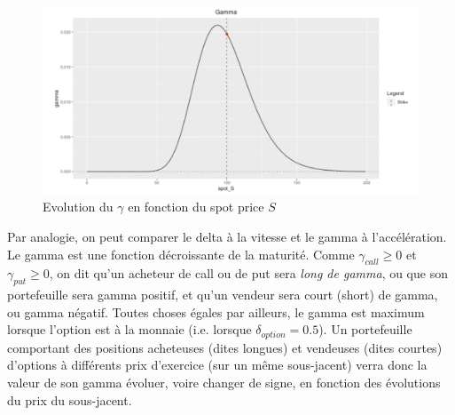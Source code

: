 \documentclass[a4paper]{article}
\begin{document}
\begin{figure}[H]
    \centering
    \includegraphics[scale=0.6]{figures/gamma.png}
    \caption{Evolution du $\gamma$ en fonction du spot price $S$}
    \label{fig:enter-label}
\end{figure}

Par analogie, on peut comparer le delta à la vitesse et le gamma à l'accélération. Le gamma est une fonction décroissante de la maturité. 
Comme $\gamma_{call} \geq 0$ et $\gamma_{put} \geq 0$, on dit qu'un acheteur de call ou de put sera \textit{long de gamma}, ou que son portefeuille sera gamma positif, et qu'un vendeur sera court (short) de gamma, ou gamma négatif. Toutes choses égales par ailleurs, le gamma est maximum lorsque l'option est à la monnaie (i.e. lorsque $\delta_{option} = 0.5$). Un portefeuille comportant des positions acheteuses (dites longues) et vendeuses (dites courtes) d'options à différents prix d'exercice (sur un même sous-jacent) verra donc la valeur de son gamma évoluer, voire changer de signe, en fonction des évolutions du prix du sous-jacent. 
\end{document}
